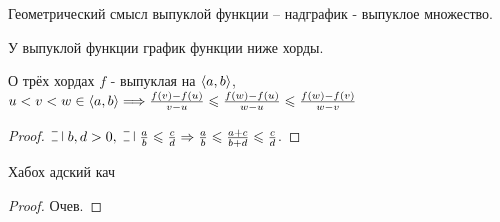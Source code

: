 \quad

\begin{remark}
    Геометрический смысл выпуклой функции -- надграфик - выпуклое множество.
\end{remark}

\begin{remark}
    У выпуклой функции график функции ниже хорды.
\end{remark}

\begin{namedlemma}{О трёх хордах} 
    $f$ - выпуклая на $\left\langle {a, b} \right\rangle$, $u < v < w \in \left\langle {a, b} \right\rangle \Longrightarrow \\ \frac{f(v) - f(u)}{v - u} \leqslant \frac{f(w) - f(u)}{w - u} \leqslant \frac{f(w) - f(v)}{w - v} $
\end{namedlemma}

\begin{proof}
    $\letus\; b, d > 0, \; \letus \; \frac{a}{b} \leqslant \frac{c}{d} \Rightarrow \frac{a}{b} \leqslant \frac{a + c}{b + d} \leqslant \frac{c}{d}$.
\end{proof}

\begin{theorem}
    Хабох адский кач
\end{theorem}

\begin{proof}
    Очев.
\end{proof}
